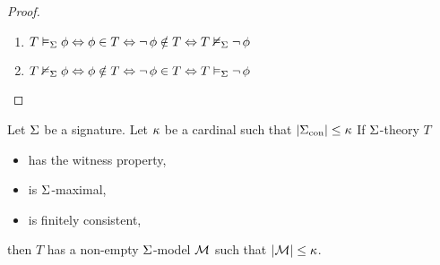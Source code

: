\begin{proof}
\begin{enumerate}
        \item $T \vDash_{\Sigma} \phi \Leftrightarrow \phi \in T \Leftrightarrow 
        \neg\, \phi \notin T \Leftrightarrow T \nvDash_{\Sigma} \neg\, \phi$

        \item $T \nvDash_{\Sigma} \phi \Leftrightarrow \phi \notin T \Leftrightarrow 
        \neg\, \phi \in T \Leftrightarrow T \vDash_{\Sigma} \neg\, \phi$

    \end{enumerate}
    
\end{proof}

\begin{prop}
    Let $\Sigma$ be a signature.
    Let $\kappa$ be a cardinal such that $|{\Sigma}_\mathrm{con}|\leq \kappa$
    If $\Sigma$-theory $T$ 
    \begin{itemize}
        \item has the witness property,
        \item is $\Sigma$-maximal,
        \item is finitely consistent, 
    \end{itemize}
    then $T$ has a non-empty $\Sigma$-model $\mathcal{M}$ such that $|\mathcal{M}| \leq \kappa$.
\end{prop}
